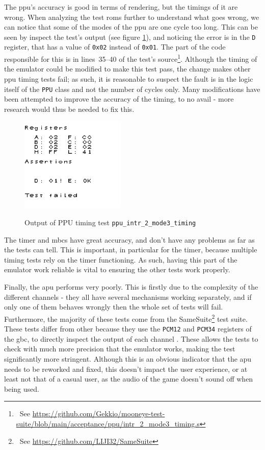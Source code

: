 \documentclass[11pt]{report}
\newcommand{\ftnt}[1]{\footnote{~See \url{#1}}}
\begin{document}
The \gls{ppu}'s accuracy is good in terms of rendering, but the timings of it are wrong. When analyzing the test \glspl{rom} further to understand what goes wrong, we can notice that some of the modes of the \gls{ppu} are one cycle too long. This can be seen by inspect the test's output (see figure \ref{fig:failed-ppu-timing-test}), and noticing the error is in the \texttt{D} register, that has a value of \texttt{0x02} instead of \texttt{0x01}. The part of the code responsible for this is in lines~35--40 of the test's source\ftnt{https://github.com/Gekkio/mooneye-test-suite/blob/main/acceptance/ppu/intr\_2\_mode3\_timing.s}. Although the timing of the emulator could be modified to make this test pass, the change makes other \gls{ppu} timing tests fail; as such, it is reasonable to suspect the fault is in the logic itself of the \texttt{PPU} class and not the number of cycles only. Many modifications have been attempted to improve the accuracy of the timing, to no avail - more research would thus be needed to fix this.

\begin{figure}[h]
    \centering
    \includegraphics[width=5cm]{images/failed-ppu-timing-test}\\
    \caption{Output of PPU timing test \texttt{ppu\_intr\_2\_mode3\_timing}}
    \label{fig:failed-ppu-timing-test}
\end{figure}

The timer and \glspl{mbc} have great accuracy, and don't have any problems as far as the tests can tell. This is important, in particular for the timer, because multiple timing tests rely on the timer functioning. As such, having this part of the emulator work reliable is vital to ensuring the other tests work properly.

Finally, the \gls{apu} performs very poorly. This is firstly due to the complexity of the different channels - they all have several mechanisms working separately, and if only one of them behaves wrongly then the whole set of tests will fail. Furthermore, the majority of these tests come from the SameSuite\ftnt{https://github.com/LIJI32/SameSuite} test suite. These tests differ from other because they use the \texttt{PCM12} and \texttt{PCM34} registers of the \gls{gbc}, to directly inspect the output of each channel \cite[Audio Details]{pandoc}. These allows the tests to check with much more precision that the emulator works, making the test significantly more stringent. Although this is an obvious indicator that the \gls{apu} needs to be reworked and fixed, this doesn't impact the user experience, or at least not that of a casual user, as the audio of the game doesn't sound off when being used.
\end{document}
